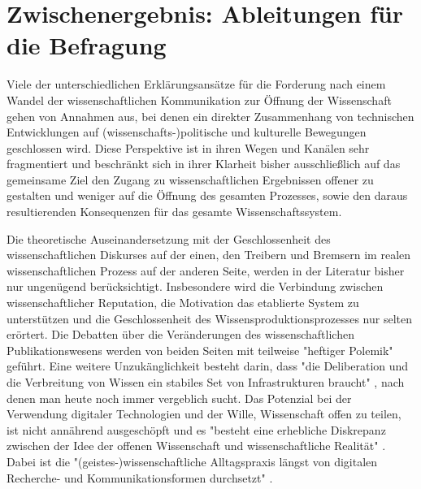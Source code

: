 \section{Zwischenergebnis: Ableitungen für die Befragung}

Viele der unterschiedlichen Erklärungsansätze für die Forderung nach einem Wandel der wissenschaftlichen Kommunikation zur Öffnung der Wissenschaft gehen von Annahmen aus, bei denen ein direkter Zusammenhang von technischen Entwicklungen auf (wissenschafts-)politische und kulturelle Bewegungen geschlossen wird. Diese Perspektive ist in ihren Wegen und Kanälen sehr fragmentiert und beschränkt sich in ihrer Klarheit bisher ausschließlich auf das gemeinsame Ziel den Zugang zu wissenschaftlichen Ergebnissen offener zu gestalten und weniger auf die Öffnung des gesamten Prozesses, sowie den daraus resultierenden Konsequenzen für das gesamte Wissenschaftssystem.

Die theoretische Auseinandersetzung mit der Geschlossenheit des wissenschaftlichen Diskurses auf der einen, den Treibern und Bremsern im realen wissenschaftlichen Prozess auf der anderen Seite, werden in der Literatur bisher nur ungenügend berücksichtigt. Insbesondere wird die Verbindung zwischen wissenschaftlicher Reputation, die Motivation das etablierte System zu unterstützen und die Geschlossenheit des Wissensproduktionsprozesses nur selten erörtert. Die Debatten über die Veränderungen des wissenschaftlichen Publikationswesens werden von beiden Seiten mit teilweise "heftiger Polemik" \cite[:12]{naeder_2010_open} geführt. Eine weitere Unzukänglichkeit besteht darin, dass "die Deliberation und die Verbreitung von Wissen ein stabiles Set von Infrastrukturen braucht" \cite{kelty_2004}, nach denen man heute noch immer vergeblich sucht. Das Potenzial bei der Verwendung digitaler Technologien und der Wille, Wissenschaft offen zu teilen, ist nicht annährend ausgeschöpft und es "besteht eine erhebliche Diskrepanz zwischen der Idee der offenen Wissenschaft und wissenschaftliche Realität" \cite{Scheliga_2014}. Dabei ist die "(geistes-)wissenschaftliche Alltagspraxis längst von digitalen Recherche- und Kommunikationsformen durchsetzt" \cite{hagner_2015_sache_buches}.

